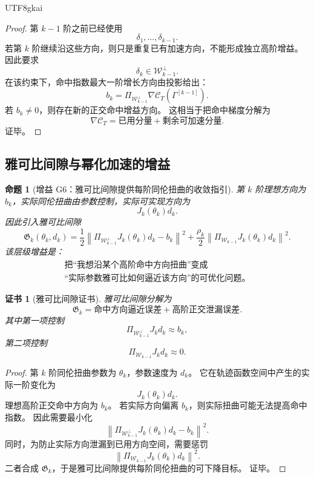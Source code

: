 \documentclass[12pt]{article}
\newtheorem{proposition}{命题}[section]
\newtheorem{Certificate}{证书}[section]
\begin{document}
\begin{CJK*}{UTF8}{gkai}
\begin{proof}
第 \(k-1\) 阶之前已经使用
\[
  \delta_1,\ldots,\delta_{k-1}.
\]
若第 \(k\) 阶继续沿这些方向，则只是重复已有加速方向，不能形成独立高阶增益。
因此要求
\[
  \delta_k\in\mathcal W_{k-1}^\perp.
\]
在该约束下，命中指数最大一阶增长方向由投影给出：
\[
  b_k
  =
  \Pi_{\mathcal W_{k-1}^\perp}
  \nabla\mathcal C_T(\Gamma^{[k-1]}).
\]
若 \(b_k\neq0\)，则存在新的正交命中增益方向。
这相当于把命中梯度分解为
\[
  \nabla\mathcal C_T
  =
  \text{已用分量}
  +
  \text{剩余可加速分量}.
\]
证毕。
\end{proof}

\subsection{雅可比间隙与幂化加速的增益}
\label{subsec:tex55-gain-jacobian-power}

\begin{proposition}[增益 G6：雅可比间隙提供每阶同伦扭曲的收敛指引]
\label{prop:tex55-gain-jacobian-gap}
第 \(k\) 阶理想方向为 \(b_k\)，实际同伦扭曲由参数控制，实际可实现方向为
\[
  J_k(\theta_k)d_k.
\]
因此引入雅可比间隙
\[
  \mathfrak G_k(\theta_k,d_k)
  =
  \frac12
  \left\lVert
  \Pi_{\mathcal W_{k-1}^{\perp}}
  J_k(\theta_k)d_k
  -
  b_k
  \right\rVert^2
  +
  \frac{\rho_k}{2}
  \left\lVert
  \Pi_{\mathcal W_{k-1}}
  J_k(\theta_k)d_k
  \right\rVert^2.
\]
该层级增益是：
\[
  \boxed{
  \begin{gathered}
  \text{把“我想沿某个高阶命中方向扭曲”变成}\\
  \text{“实际参数雅可比如何逼近该方向”的可优化问题。}
  \end{gathered}
  }
\]
\end{proposition}

\begin{Certificate}[雅可比间隙证书]
\label{cert:tex55-gain-jacobian-gap}
雅可比间隙分解为
\[
  \mathfrak G_k
  =
  \text{命中方向逼近误差}
  +
  \text{高阶正交泄漏误差}.
\]
其中第一项控制
\[
  \Pi_{\mathcal W_{k-1}^\perp}J_kd_k\approx b_k,
\]
第二项控制
\[
  \Pi_{\mathcal W_{k-1}}J_kd_k\approx0.
\]
\end{Certificate}

\begin{proof}
第 \(k\) 阶同伦扭曲参数为 \(\theta_k\)，参数速度为 \(d_k\)。
它在轨迹函数空间中产生的实际一阶变化为
\[
  J_k(\theta_k)d_k.
\]
理想高阶正交命中方向为 \(b_k\)。
若实际方向偏离 \(b_k\)，则实际扭曲可能无法提高命中指数。
因此需要最小化
\[
  \left\lVert
  \Pi_{\mathcal W_{k-1}^{\perp}}
  J_k(\theta_k)d_k
  -
  b_k
  \right\rVert^2.
\]
同时，为防止实际方向泄漏到已用方向空间，需要惩罚
\[
  \left\lVert
  \Pi_{\mathcal W_{k-1}}
  J_k(\theta_k)d_k
  \right\rVert^2.
\]
二者合成 \(\mathfrak G_k\)，于是雅可比间隙提供每阶同伦扭曲的可下降目标。
证毕。
\end{proof}


\end{CJK*}
\end{document}
